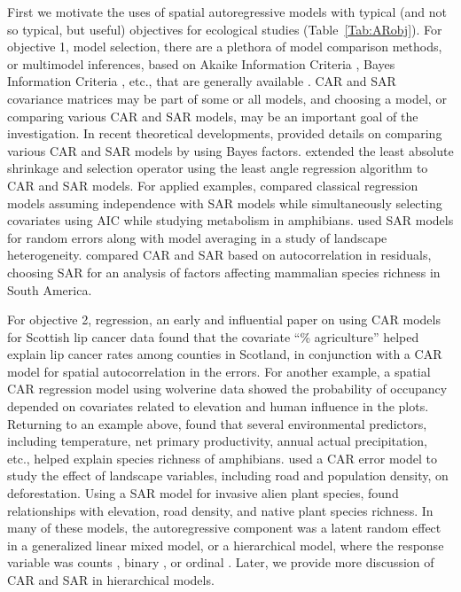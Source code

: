 \documentclass[11pt, titlepage]{article}\usepackage[]{graphicx}\usepackage[]{color}
\begin{document}
\begin{spacing}{1.9}
\begin{flushleft}
First we motivate the uses of spatial autoregressive models with typical (and not so typical, but useful) objectives for ecological studies (Table~\ref{Tab:ARobj}). For objective 1, model selection, there are a plethora of model comparison methods, or multimodel inferences, based on Akaike Information Criteria \citep[AIC,][]{Akai:Info:1973}, Bayes Information Criteria \citep[BIC,][]{Schw:esti:1978}, etc., that are generally available \citep[see, e.g.,][]{Burn:Ande:mode:2002,Hoot:Hobb:guid:2015}.  CAR and SAR covariance matrices may be part of some or all models, and choosing a model, or comparing various CAR and SAR models, may be an important goal of the investigation. In recent theoretical developments, \citet{Song:DeOl:Baye:2012} provided details on comparing various CAR and SAR models by using Bayes factors. \citet{Zhu:Huan:Reye:sele:2010} extended the least absolute shrinkage and selection operator \citep[LASSO, ][]{Tibs:regr:1996} using the least angle regression algorithm \citep[LARS, ][]{Efro:Hast:John:Tibs:leas:2004} to CAR and SAR models. For applied examples, \citet{Cass:Dini:Rang:Thia:spat:2007} compared classical regression models assuming independence with SAR models while simultaneously selecting covariates using AIC while studying metabolism in amphibians. \citet{Qui:Turn:impo:2015} used SAR models for random errors along with model averaging in a study of landscape heterogeneity. \citet{Togn:Kelt:anal:2004} compared CAR and SAR based on autocorrelation in residuals, choosing SAR for an analysis of factors affecting mammalian species richness in South America.

For objective 2, regression, an early and influential paper on using CAR models for Scottish lip cancer data \citep{Clay:Kald:empi:1987} found that the covariate ``\% agriculture'' helped explain lip cancer rates among counties in Scotland, in conjunction with a CAR model for spatial autocorrelation in the errors.  For another example, a spatial CAR regression model using wolverine data \citep{Gard:Lawl:Ver:Mago:Kell:coar:2010} showed the probability of occupancy depended on covariates related to elevation and human influence in the plots. Returning to an example above, \citet{Cass:Dini:Rang:Thia:spat:2007} found that several environmental predictors, including temperature, net primary productivity, annual actual precipitation, etc., helped explain species richness of amphibians.  \citet{Agar:Sila:Gelf:Dewa:Mick:trop:2005} used a CAR error model to study the effect of landscape variables, including road and population density, on deforestation.  Using a SAR model for invasive alien plant species, \citet{Dark:biog:2004} found relationships with elevation, road density, and native plant species richness. In many of these models, the autoregressive component was a latent random effect in a generalized linear mixed model, or a hierarchical model, where the response variable was counts \citep{Clay:Kald:empi:1987}, binary \citep{Gard:Lawl:Ver:Mago:Kell:coar:2010}, or ordinal \citep{Agar:Sila:Gelf:Dewa:Mick:trop:2005}.  Later, we provide more discussion of CAR and SAR in hierarchical models.


\end{flushleft}
\end{spacing}
\end{document}
